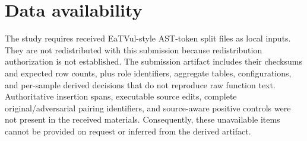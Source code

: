 \documentclass[a4paper,fleqn]{cas-dc}
\begin{document}
\section*{Data availability}
The study requires received EaTVul-style AST-token split files as local inputs. They are not redistributed with this submission because redistribution authorization is not established. The submission artifact includes their checksums and expected row counts, plus role identifiers, aggregate tables, configurations, and per-sample derived decisions that do not reproduce raw function text. Authoritative insertion spans, executable source edits, complete original/adversarial pairing identifiers, and source-aware positive controls were not present in the received materials. Consequently, these unavailable items cannot be provided on request or inferred from the derived artifact.



\end{document}
